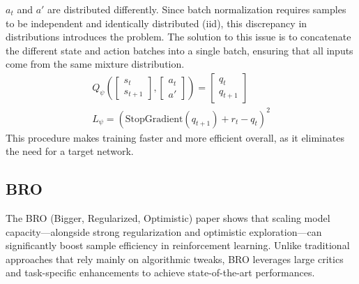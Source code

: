 $a_t$ and $a'$ are distributed differently. Since batch normalization requires samples to be independent and identically 
distributed (iid), this discrepancy in distributions introduces the problem. The solution to 
this issue is to concatenate the different state and action batches into a single batch, 
ensuring that all inputs come from the same mixture distribution.
\begin{gather*}
     Q_\psi\left(\begin{bmatrix}
    s_t\\s_{t+1}
\end{bmatrix}, 
\begin{bmatrix}
    a_t\\a'
\end{bmatrix}\right) = \begin{bmatrix}
    q_t\\q_{t+1}
\end{bmatrix} \\
L_\psi = \left(\text{StopGradient}(q_{t+1})+r_t-q_t\right)^2
\end{gather*}
This procedure makes training faster and more efficient overall, as it eliminates the need for a target network.

\subsection{BRO}
The BRO (Bigger, Regularized, Optimistic) paper \cite{nauman2024biggerregularizedoptimisticscaling} shows that scaling model capacity—alongside strong regularization and optimistic 
exploration—can significantly boost sample efficiency in reinforcement learning. Unlike traditional approaches that rely mainly on algorithmic tweaks, BRO leverages large critics and task-specific enhancements to achieve state-of-the-art performances. 

